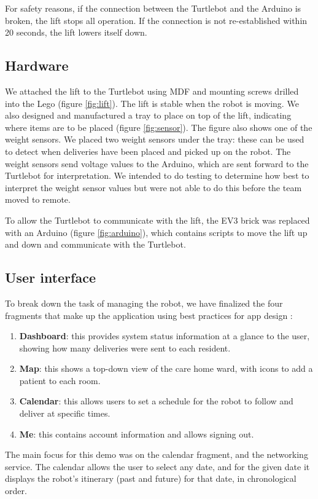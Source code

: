 \documentclass{article}
\begin{document}
For safety reasons, if the connection between the Turtlebot and the Arduino is broken, the lift stops all operation. If the connection is not re-established within 20 seconds, the lift lowers itself down.  

\subsection{Hardware}
We attached the lift to the Turtlebot using MDF and mounting screws drilled into the Lego (figure \ref{fig:lift}). The lift is stable when the robot is moving. We also designed and manufactured a tray to place on top of the lift, indicating where items are to be placed (figure \ref{fig:sensor}). The figure also shows one of the weight sensors. We placed two weight sensors under the tray: these can be used to detect when deliveries have been placed and picked up on the robot. The weight sensors send voltage values to the Arduino, which are sent forward to the Turtlebot for interpretation. We intended to do testing to determine how best to interpret the weight sensor values but were not able to do this before the team moved to remote. 

To allow the Turtlebot to communicate with the lift, the EV3 brick was replaced with an Arduino (figure \ref{fig:arduino}), which contains scripts to move the lift up and down and communicate with the Turtlebot. 

\subsection{User interface}
To break down the task of managing the robot, we have finalized the four fragments that make up the application using best practices for app design \cite{design, ux}:
\begin{enumerate}
  \item {\bf Dashboard}: this provides system status information at a glance to the user, showing how many deliveries were sent to each resident.
  \item {\bf Map}: this shows a top-down view of the care home ward, with icons to add a patient to each room.
  \item {\bf Calendar}: this allows users to set a schedule for the robot to follow and deliver at specific times.
  \item {\bf Me}: this contains account information and allows signing out. 
\end{enumerate}

The main focus for this demo was on the calendar fragment, and the networking service. The calendar allows the user to select any date, and for the given date it displays the robot's itinerary (past and future) for that date, in chronological order.
\end{document}
